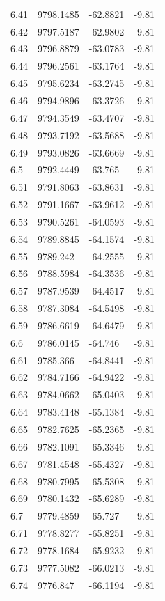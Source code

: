 \begin{table}[H]
\begin{tabular}{llll}
6.41 & 9798.1485 & -62.8821 & -9.81 \\
6.42 & 9797.5187 & -62.9802 & -9.81 \\
6.43 & 9796.8879 & -63.0783 & -9.81 \\
6.44 & 9796.2561 & -63.1764 & -9.81 \\
6.45 & 9795.6234 & -63.2745 & -9.81 \\
6.46 & 9794.9896 & -63.3726 & -9.81 \\
6.47 & 9794.3549 & -63.4707 & -9.81 \\
6.48 & 9793.7192 & -63.5688 & -9.81 \\
6.49 & 9793.0826 & -63.6669 & -9.81 \\
6.5 & 9792.4449 & -63.765 & -9.81 \\
6.51 & 9791.8063 & -63.8631 & -9.81 \\
6.52 & 9791.1667 & -63.9612 & -9.81 \\
6.53 & 9790.5261 & -64.0593 & -9.81 \\
6.54 & 9789.8845 & -64.1574 & -9.81 \\
6.55 & 9789.242 & -64.2555 & -9.81 \\
6.56 & 9788.5984 & -64.3536 & -9.81 \\
6.57 & 9787.9539 & -64.4517 & -9.81 \\
6.58 & 9787.3084 & -64.5498 & -9.81 \\
6.59 & 9786.6619 & -64.6479 & -9.81 \\
6.6 & 9786.0145 & -64.746 & -9.81 \\
6.61 & 9785.366 & -64.8441 & -9.81 \\
6.62 & 9784.7166 & -64.9422 & -9.81 \\
6.63 & 9784.0662 & -65.0403 & -9.81 \\
6.64 & 9783.4148 & -65.1384 & -9.81 \\
6.65 & 9782.7625 & -65.2365 & -9.81 \\
6.66 & 9782.1091 & -65.3346 & -9.81 \\
6.67 & 9781.4548 & -65.4327 & -9.81 \\
6.68 & 9780.7995 & -65.5308 & -9.81 \\
6.69 & 9780.1432 & -65.6289 & -9.81 \\
6.7 & 9779.4859 & -65.727 & -9.81 \\
6.71 & 9778.8277 & -65.8251 & -9.81 \\
6.72 & 9778.1684 & -65.9232 & -9.81 \\
6.73 & 9777.5082 & -66.0213 & -9.81 \\
6.74 & 9776.847 & -66.1194 & -9.81 \\

\end{tabular}
\end{table}
